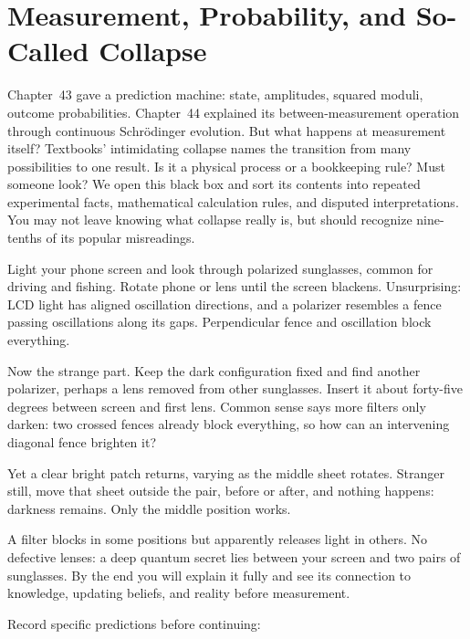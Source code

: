 \chapter[Measurement, Probability, and Collapse]{Measurement, Probability, and So-Called Collapse}

Chapter~43 gave a prediction machine: state, amplitudes, squared moduli, outcome probabilities. Chapter~44 explained its between-measurement operation through continuous Schrödinger evolution. But what happens at measurement itself? Textbooks' intimidating collapse names the transition from many possibilities to one result. Is it a physical process or a bookkeeping rule? Must someone look? We open this black box and sort its contents into repeated experimental facts, mathematical calculation rules, and disputed interpretations. You may not leave knowing what collapse really is, but should recognize nine-tenths of its popular misreadings.


Light your phone screen and look through polarized sunglasses, common for driving and fishing. Rotate phone or lens until the screen blackens. Unsurprising: LCD light has aligned oscillation directions, and a polarizer resembles a fence passing oscillations along its gaps. Perpendicular fence and oscillation block everything.

Now the strange part. Keep the dark configuration fixed and find another polarizer, perhaps a lens removed from other sunglasses. Insert it about forty-five degrees between screen and first lens. Common sense says more filters only darken: two crossed fences already block everything, so how can an intervening diagonal fence brighten it?

Yet a clear bright patch returns, varying as the middle sheet rotates. Stranger still, move that sheet outside the pair, before or after, and nothing happens: darkness remains. Only the middle position works.

A filter blocks in some positions but apparently releases light in others. No defective lenses: a deep quantum secret lies between your screen and two pairs of sunglasses. By the end you will explain it fully and see its connection to knowledge, updating beliefs, and reality before measurement.


Record specific predictions before continuing:

